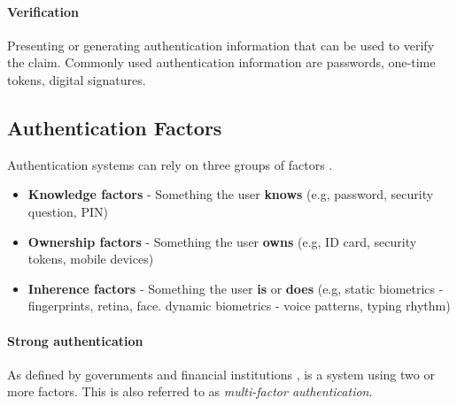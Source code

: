 \paragraph{Verification} Presenting or generating authentication information that can be used to verify the claim.
Commonly used authentication information are passwords, one-time tokens, digital signatures.

\subsection{Authentication Factors}

Authentication systems can rely on three groups of factors \cite{council2005authentication}.

\begin{itemize}
	\item \textbf{Knowledge factors} - Something the user \textbf{knows} (e.g, password, security question, PIN)
	\item \textbf{Ownership factors} - Something the user \textbf{owns} (e.g, ID card, security tokens, mobile devices)
	\item \textbf{Inherence factors} - Something the user \textbf{is} or \textbf{does} (e.g, static biometrics - fingerprints, retina, face. dynamic biometrics - voice patterns, typing rhythm)
\end{itemize}

\paragraph{Strong authentication} As defined by governments and financial institutions \cite{schaeffer2010national, ecb2013recommendations}, is a system using two or more factors.
This is also referred to as \textit{multi-factor authentication}.

\newpage
